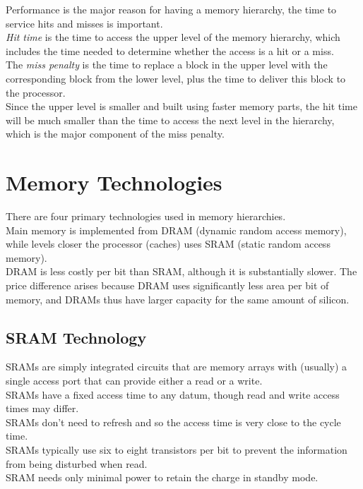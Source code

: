 \documentclass[12pt]{article}
\theoremstyle{definition}
\begin{document}
  Performance is the major reason for having a memory hierarchy, the time to service hits and misses is important. \\
  \emph{Hit time} is the time to access the upper level of the memory hierarchy, which includes the time needed to determine whether the access is a hit or a miss. \\
  The \emph{miss penalty} is the time to replace a block in the upper level with the corresponding block from the lower level, plus the time to deliver this block to the processor. \\
  Since the upper level is smaller and built using faster memory parts, the hit time will be much smaller than the time to access the next level in the hierarchy, which is the major component of the miss penalty.

  \section{Memory Technologies}
  There are four primary technologies used in memory hierarchies. \\
  Main memory is implemented from DRAM (dynamic random access memory), while levels closer the processor (caches) uses SRAM (static random access memory). \\
  DRAM is less costly per bit than SRAM, although it is substantially slower.
  The price difference arises because DRAM uses significantly less area per bit of memory, and DRAMs thus have larger capacity for the same amount of silicon.

  \subsection{SRAM Technology}
  SRAMs are simply integrated circuits that are memory arrays with (usually) a single access port that can provide either a read or a write. \\
  SRAMs have a fixed access time to any datum, though read and write access times may differ. \\
  SRAMs don't need to refresh and so the access time is very close to the cycle time. \\
  SRAMs typically use six to eight transistors per bit to prevent the information from being disturbed when read. \\
  SRAM needs only minimal power to retain the charge in standby mode.
\end{document}
